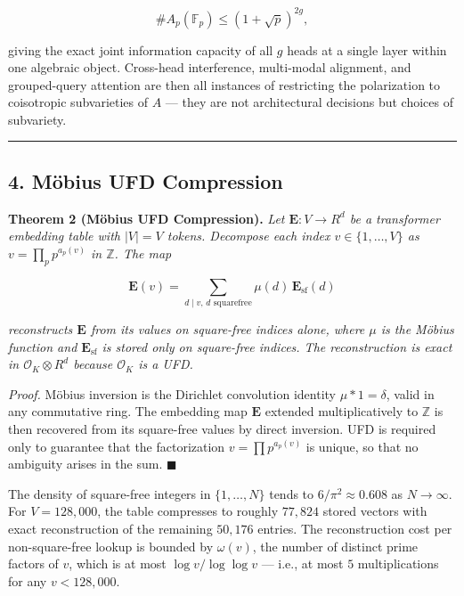 \documentclass[
  11pt,
]{article}
\begin{document}
\[\#A_p(\mathbb{F}_p) \leq (1 + \sqrt{p})^{2g},\]

giving the exact joint information capacity of all \(g\) heads at a
single layer within one algebraic object. Cross-head interference,
multi-modal alignment, and grouped-query attention are then all
instances of restricting the polarization to coisotropic subvarieties of
\(A\) --- they are not architectural decisions but choices of
subvariety.

\begin{center}\rule{0.5\linewidth}{0.5pt}\end{center}

\hypertarget{muxf6bius-ufd-compression}{%
\subsection{4. Möbius UFD Compression}\label{muxf6bius-ufd-compression}}

\textbf{Theorem 2 (Möbius UFD Compression).} \emph{Let
\(\mathbf{E} : V \to R^d\) be a transformer embedding table with
\(|V| = V\) tokens. Decompose each index \(v \in \{1, \dots, V\}\) as
\(v = \prod_p p^{a_p(v)}\) in \(\mathbb{Z}\). The map}

\[\mathbf{E}(v) = \sum_{d \mid v, \, d \text{ squarefree}} \mu(d) \, \mathbf{E}_{\text{sf}}(d)\]

\emph{reconstructs \(\mathbf{E}\) from its values on square-free indices
alone, where \(\mu\) is the Möbius function and
\(\mathbf{E}_{\text{sf}}\) is stored only on square-free indices. The
reconstruction is exact in \(\mathcal{O}_K \otimes R^d\) because
\(\mathcal{O}_K\) is a UFD.}

\emph{Proof.} Möbius inversion is the Dirichlet convolution identity
\(\mu * 1 = \delta\), valid in any commutative ring. The embedding map
\(\mathbf{E}\) extended multiplicatively to \(\mathbb{Z}\) is then
recovered from its square-free values by direct inversion. UFD is
required only to guarantee that the factorization
\(v = \prod p^{a_p(v)}\) is unique, so that no ambiguity arises in the
sum. \(\blacksquare\)

The density of square-free integers in \(\{1, \dots, N\}\) tends to
\(6/\pi^2 \approx 0.608\) as \(N \to \infty\). For \(V = 128{,}000\),
the table compresses to roughly \(77{,}824\) stored vectors with exact
reconstruction of the remaining \(50{,}176\) entries. The reconstruction
cost per non-square-free lookup is bounded by \(\omega(v)\), the number
of distinct prime factors of \(v\), which is at most
\(\log v / \log \log v\) --- i.e., at most \(5\) multiplications for any
\(v < 128{,}000\).
\end{document}
